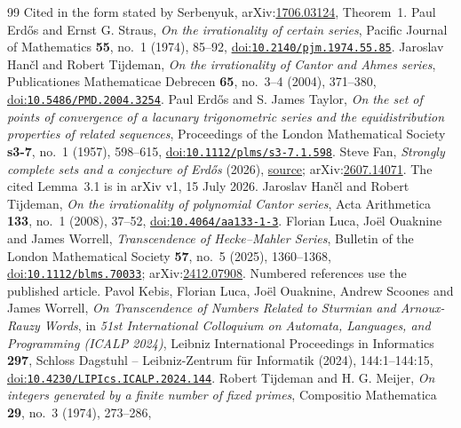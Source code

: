 \documentclass[11pt]{article}
\begin{document}
\begin{thebibliography}{99}
  Cited in the form stated by Serbenyuk, arXiv:\href{https://arxiv.org/abs/1706.03124}{1706.03124}, Theorem~1.
 Paul Erd\H{o}s and Ernst G. Straus,
  \emph{On the irrationality of certain series}, Pacific Journal of Mathematics \textbf{55}, no.~1 (1974), 85--92,
  \href{https://doi.org/10.2140/pjm.1974.55.85}{doi:\nolinkurl{10.2140/pjm.1974.55.85}}.
 Jaroslav Han\v{c}l and Robert Tijdeman,
  \emph{On the irrationality of Cantor and Ahmes series}, Publicationes Mathematicae Debrecen \textbf{65}, no.~3--4 (2004), 371--380,
  \href{https://doi.org/10.5486/PMD.2004.3254}{doi:\nolinkurl{10.5486/PMD.2004.3254}}.
 Paul Erd\H{o}s and S. James Taylor,
  \emph{On the set of points of convergence of a lacunary trigonometric series and the equidistribution properties of related sequences}, Proceedings of the London Mathematical Society \textbf{s3-7}, no.~1 (1957), 598--615,
  \href{https://doi.org/10.1112/plms/s3-7.1.598}{doi:\nolinkurl{10.1112/plms/s3-7.1.598}}.
 Steve Fan,
  \emph{Strongly complete sets and a conjecture of Erd\H{o}s} (2026),
  \href{https://arxiv.org/abs/2607.14071v1}{source}; arXiv:\href{https://arxiv.org/abs/2607.14071}{2607.14071}. The cited Lemma~3.1 is in arXiv v1, 15 July 2026.
 Jaroslav Han\v{c}l and Robert Tijdeman,
  \emph{On the irrationality of polynomial Cantor series}, Acta Arithmetica \textbf{133}, no.~1 (2008), 37--52,
  \href{https://doi.org/10.4064/aa133-1-3}{doi:\nolinkurl{10.4064/aa133-1-3}}.
 Florian Luca, Jo\"{e}l Ouaknine and James Worrell,
  \emph{Transcendence of Hecke--Mahler Series}, Bulletin of the London Mathematical Society \textbf{57}, no.~5 (2025), 1360--1368,
  \href{https://doi.org/10.1112/blms.70033}{doi:\nolinkurl{10.1112/blms.70033}}; arXiv:\href{https://arxiv.org/abs/2412.07908}{2412.07908}. Numbered references use the published article.
 Pavol Kebis, Florian Luca, Jo\"{e}l Ouaknine, Andrew Scoones and James Worrell,
  \emph{On Transcendence of Numbers Related to Sturmian and Arnoux-Rauzy Words}, in \emph{51st International Colloquium on Automata, Languages, and Programming (ICALP 2024)}, Leibniz International Proceedings in Informatics \textbf{297}, Schloss Dagstuhl -- Leibniz-Zentrum f\"{u}r Informatik (2024), 144:1--144:15,
  \href{https://doi.org/10.4230/LIPIcs.ICALP.2024.144}{doi:\nolinkurl{10.4230/LIPIcs.ICALP.2024.144}}.
 Robert Tijdeman and H. G. Meijer,
  \emph{On integers generated by a finite number of fixed primes}, Compositio Mathematica \textbf{29}, no.~3 (1974), 273--286,

\end{thebibliography}
\end{document}
